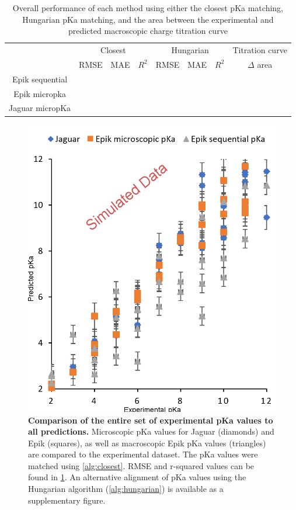 \documentclass[9pt,lineno,final]{elife}
\begin{document}
\begin{table}[H]
	\centering
	\caption{Overall performance of each method using either the closest pKa matching, Hungarian pKa matching,  and the area between the experimental and predicted macroscopic charge titration curve}
	\label{tab:overview-performance}
	\begin{tabular}{c|ccc|ccc|c}
		& \multicolumn{3}{c|}{Closest} & \multicolumn{3}{c|}{Hungarian} & Titration curve \\ \cline{2-8} 
		                & RMSE & MAE & $R^2$ & RMSE & MAE & $R^2$ & $\Delta $ area \\ \hline
		Epik sequential &      &     &       &      &     &       &           \\
		Epik micropka   &      &     &       &      &     &       &           \\
		Jaguar micropKa &      &     &       &      &     &       &           
	\end{tabular}
\end{table}
    

\begin{figure}[H]
\centering
\includegraphics[width=0.8\linewidth]{pKa-comparison-simulated.png}
\caption{{\bf Comparison of the entire set of experimental pKa values to all predictions.} Microscopic pKa values for Jaguar (diamonds) and Epik (squares), as well as macroscopic Epik pKa values (triangles) are compared to the experimental dataset. The pKa values were matched using \cref{alg:closest}. RMSE and r-squared values can be found in \cref{tab:overview-performance}. An alternative alignment of pKa values using the Hungarian algorithm (\cref{alg:hungarian}) is available as a supplementary figure. \label{correlation-closest}}

\end{figure}
    
\end{document}
